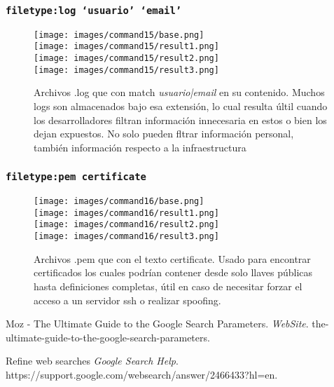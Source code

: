 \documentclass[11pt]{utalcaDoc}
\begin{document}
\subsubsection{\texttt{filetype:log \enquote*{usuario} \enquote*{email}}}
\begin{figure}[H]
	\centering
\begin{multicols}{4}
	\texttt{[image: images/command15/base.png]}\\
	\texttt{[image: images/command15/result1.png]}\\
	\texttt{[image: images/command15/result2.png]}\\
	\texttt{[image: images/command15/result3.png]}\\
\end{multicols}
\caption{Archivos .log que con match \textit{usuario|email} en su contenido. Muchos logs son almacenados bajo esa extensión, lo cual resulta últil cuando los desarrolladores filtran información innecesaria en estos o bien los dejan expuestos. No solo pueden fltrar información personal, también información respecto a la infraestructura}
\label{FIG:command15}
\end{figure}



\subsubsection{\texttt{filetype:pem certificate}}
\begin{figure}[H]
	\centering
\begin{multicols}{4}
	\texttt{[image: images/command16/base.png]}\\
	\texttt{[image: images/command16/result1.png]}\\
	\texttt{[image: images/command16/result2.png]}\\
	\texttt{[image: images/command16/result3.png]}\\
\end{multicols}
\caption{Archivos .pem que con el texto certificate. Usado para encontrar certificados los cuales podrían contener desde solo llaves públicas hasta definiciones completas, útil en caso de necesitar forzar el acceso a un servidor ssh o realizar spoofing.}
\label{FIG:command16}
\end{figure}

\begin{thebibliography}{9}
	Moz - The Ultimate Guide to the Google Search Parameters.
	\textit{WebSite}.
	the-ultimate-guide-to-the-google-search-parameters.


	Refine web searches
	\textit{Google Search Help}.
	https://support.google.com/websearch/answer/2466433?hl=en.

\end{thebibliography}
\end{document}
